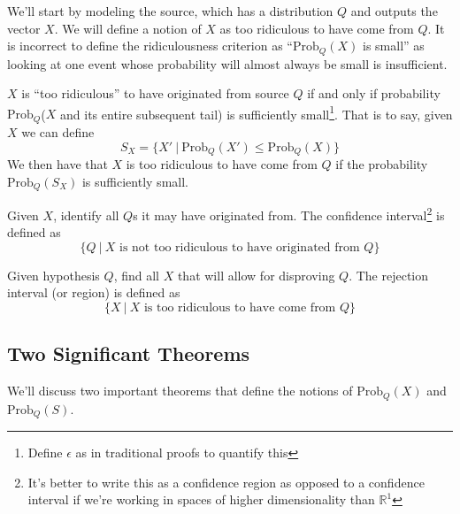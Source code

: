 \documentclass[11pt]{article}
\theoremstyle{definition}
\begin{document}
We'll start by modeling the source, which has a distribution $Q$ and outputs the vector $X$. We will define a notion of $X$ as too ridiculous to have come from $Q$. It is incorrect to define the ridiculousness criterion as ``$\text{Prob}_Q(X)$ is small'' as looking at one event whose probability will almost always be small is insufficient.

 $X$ is ``too ridiculous'' to have originated from source $Q$ if and only if probability $\text{Prob}_Q$($X$ and its entire subsequent tail) is sufficiently small\footnote{Define $\epsilon$ as in traditional proofs to quantify this}. That is to say, given $X$ we can define 
\begin{equation*}
S_X = \{ X' \: | \: \text{Prob}_Q (X') \leq \text{Prob}_Q(X) \}
\end{equation*}We then have that $X$ is too ridiculous to have come from $Q$ if the probability $\text{Prob}_Q(S_X)$ is sufficiently small.

 Given $X$, identify all $Q$s it may have originated from. The confidence interval\footnote{It's better to write this as a confidence region as opposed to a confidence interval if we're working in spaces of higher dimensionality than $\mathbb{R}^1$} is defined as $$\{Q \: | \: X \text{ is not too ridiculous to have originated from } Q\}$$

 Given hypothesis $Q$, find all $X$ that will allow for disproving $Q$. The rejection interval (or region) is defined as $$\{X \: | \: X \text{ is too ridiculous to have come from } Q \}$$

\subsection{Two Significant Theorems}

We'll discuss two important theorems that define the notions of $\text{Prob}_Q(X)$ and $\text{Prob}_Q(S)$.
\end{document}
